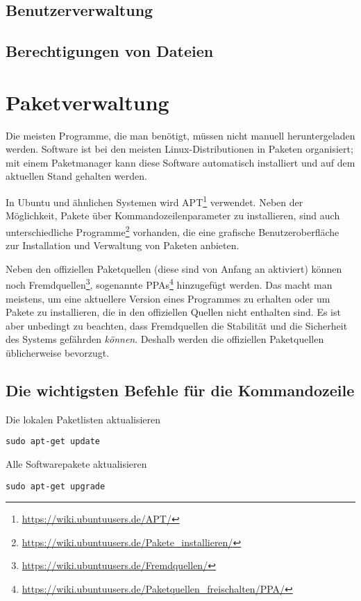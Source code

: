 \documentclass[11pt]{article}
\begin{document}
\subsection {Benutzerverwaltung}

\subsection {Berechtigungen von Dateien}


\section{Paketverwaltung}

Die meisten Programme, die man benötigt, müssen nicht manuell heruntergeladen werden. Software ist bei den meisten Linux-Distributionen in Paketen organisiert; mit einem Paketmanager kann diese Software automatisch installiert und auf dem aktuellen Stand gehalten werden.

In Ubuntu und ähnlichen Systemen wird APT\footnote{\url{https://wiki.ubuntuusers.de/APT/}} verwendet. Neben der Möglichkeit, Pakete über Kommandozeilenparameter zu installieren, sind auch unterschiedliche Programme\footnote{\url{https://wiki.ubuntuusers.de/Pakete\_installieren/}} vorhanden, die eine grafische Benutzeroberfläche zur Installation und Verwaltung von Paketen anbieten.

Neben den offiziellen Paketquellen (diese sind von Anfang an aktiviert) können noch Fremdquellen\footnote{\url{https://wiki.ubuntuusers.de/Fremdquellen/}}, sogenannte PPAs\footnote{\url{https://wiki.ubuntuusers.de/Paketquellen_freischalten/PPA/}} hinzugefügt werden. Das macht man meistens, um eine aktuellere Version eines Programmes zu erhalten oder um Pakete zu installieren, die in den offiziellen Quellen nicht enthalten sind. Es ist aber unbedingt zu beachten, dass Fremdquellen die Stabilität und die Sicherheit des Systems gefährden \emph{können}. Deshalb werden die offiziellen Paketquellen üblicherweise bevorzugt.

\subsection{Die wichtigsten Befehle für die Kommandozeile}
\begin{multicols}{2}
Die lokalen Paketlisten aktualisieren
\begin{lstlisting}
sudo apt-get update
\end{lstlisting}

Alle Softwarepakete aktualisieren
\begin{lstlisting}
sudo apt-get upgrade
\end{lstlisting}
\end{multicols}
\end{document}
